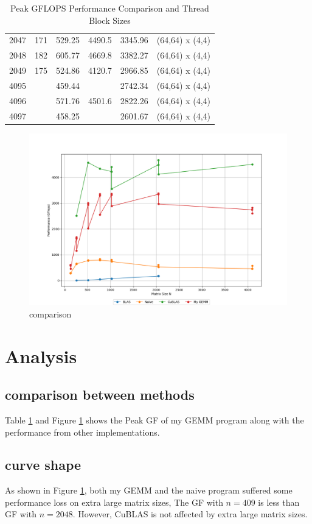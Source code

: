 \documentclass{article}
\begin{document}
\begin{table}[]
\begin{tabular}{|c|c|c|c|c|c|}
2047 & 171  & 529.25 & 4490.5 & 3345.96 & (64,64) x (4,4)\\
2048 & 182  & 605.77 & 4669.8 & 3382.27 & (64,64) x (4,4)\\
2049 & 175  & 524.86 & 4120.7 & 2966.85 & (64,64) x (4,4)\\
4095 &      & 459.44 &        & 2742.34 & (64,64) x (4,4)\\
4096 &      & 571.76 & 4501.6 & 2822.26 & (64,64) x (4,4)\\
4097 &      & 458.25 &        & 2601.67 & (64,64) x (4,4)\\
\hline
\end{tabular}
\caption{Peak GFLOPS Performance Comparison and Thread Block Sizes}
\label{tab:comparison}
\end{table}

\begin{figure}[h]
    \centering
    \includegraphics[width=\linewidth]{img/comparison.png}
    \caption{comparison}
    \label{fig:comparison}
\end{figure}


\section{Analysis}

\subsection{comparison between methods}
Table \ref{tab:comparison} and Figure \ref{fig:comparison} shows the Peak GF of my GEMM program along with the performance from other implementations.

\subsection{curve shape}
As shown in Figure \ref{fig:comparison}, both my GEMM and the naive program suffered some performance loss on extra large matrix sizes,
The GF with $n=409$ is less than GF with $n=2048$.
However, CuBLAS is not affected by extra large matrix sizes.
\end{document}
